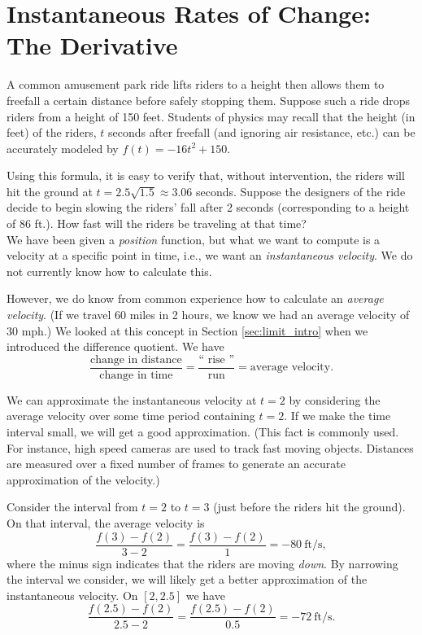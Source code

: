 \section{Instantaneous Rates of Change: The Derivative}\label{sec:derivative}

A common amusement park ride lifts riders to a height then allows them to freefall a certain distance before safely stopping them. Suppose such a ride drops riders from a height of 150 feet. Students of physics may recall that the height (in feet) of the riders, $t$ seconds after freefall (and ignoring air resistance, etc.) can be accurately modeled by $f(t) = -16t^2+150$. 

Using this formula, it is easy to verify that, without intervention, the riders will hit the ground at $t=2.5\sqrt{1.5} \approx 3.06$ seconds. Suppose the designers of the ride decide to begin slowing the riders' fall after 2 seconds (corresponding to a height of 86 ft.). How fast will the riders be traveling at that time?\\

We have been given a \textit{position} function, but what we want to compute is a velocity at a specific point in time, i.e., we want an \textit{instantaneous velocity}. We do not currently know how to calculate this.

However, we do know from common experience how to calculate an \textit{average velocity}. (If we travel 60 miles in 2 hours, we know we had an average velocity of 30 mph.) We looked at this concept in Section \ref{sec:limit_intro} when we introduced the difference quotient. We have 
	$$\frac{\text{change in distance}}{\text{change in time}} = \frac{\text{``\ rise\ ''}}{\text{run}} = \text{average velocity}.$$
	
We can approximate the instantaneous velocity at $t=2$ by considering the average velocity over some time period containing $t=2$. If we make the time interval small, we will get a good approximation. (This fact is commonly used. For instance, high speed cameras are used to track fast moving objects. Distances are measured over a fixed number of frames to generate an accurate approximation of the velocity.)

Consider the interval from $t=2$ to $t=3$ (just before the riders hit the ground). On that interval, the average velocity is 
		$$\frac{f(3)-f(2)}{3-2} = \frac{f(3)-f(2)}{1} =-80\ \text{ft/s},$$
where the minus sign indicates that the riders are moving \textit{down}. By narrowing the interval we consider, we will likely get a better approximation of the instantaneous velocity. On $[2,2.5]$ we have 
	$$\frac{f(2.5)-f(2)}{2.5-2} = \frac{f(2.5)-f(2)}{0.5} =-72\ \text{ft/s}.$$


